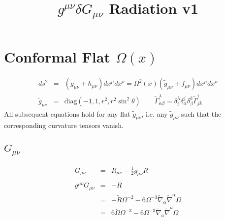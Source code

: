 \documentclass[10pt,letterpaper]{article}
\title{$g^{\mu\nu}\delta G_{\mu\nu}$ Radiation v1}
\date{}
\numberwithin{equation}{section}
\begin{document}
 
\maketitle
\noindent 
\section{Conformal Flat $\Omega(x)$}
\begin{eqnarray}
ds^2 &=& (g_{\mu\nu} + h_{\mu\nu})dx^\mu dx^\nu = \Omega^2(x)(\tilde g_{\mu\nu} + f_{\mu\nu})dx^\mu dx^\nu
\label{geom1}\\
\tilde g_{\mu\nu} &=& \text{diag}\left(-1,1,r^2,r^2\sin^2\theta\right)\qquad \tilde \Gamma^{\lambda}_{\alpha\beta} = \delta^\lambda_i \delta^j_\alpha \delta^k_\beta \tilde \Gamma^{i}_{jk}
\end{eqnarray}
All subsequent equations hold for any flat $\tilde g_{\mu\nu}$, i.e. any $\tilde g_{\mu\nu}$ such that the corresponding curvature tensors vanish. 
%
\subsection{$G_{\mu\nu}$}
\begin{eqnarray}
G_{\mu\nu} &=& R_{\mu\nu} - \tfrac12 g_{\mu\nu} R
\\ \nonumber\\
g^{\mu\nu}G_{\mu\nu} &=& -R
\nonumber\\
&=& - \tilde{R} \Omega^{-2} - 6 \Omega^{-3} \tilde{\nabla}_{\alpha }\tilde{\nabla}^{\alpha }\Omega 
\nonumber\\
&=& 6 \overset{..}{\Omega} \Omega^{-3} - 6 \Omega^{-3} \tilde{\nabla}_{a}\tilde{\nabla}^{a}\Omega 
\label{Gtr}
\end{eqnarray}
\end{document}

